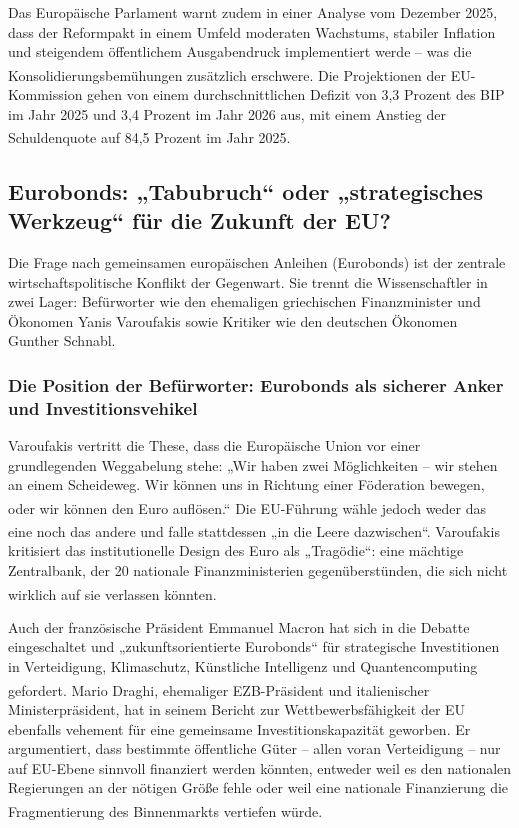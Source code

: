 \documentclass[12pt,a4paper]{article}
\newcommand{\footcite}[1]{\textsuperscript{\cite{#1}}}
\begin{document}
	Das Europäische Parlament warnt zudem in einer Analyse vom Dezember 2025, dass der Reformpakt in einem Umfeld moderaten Wachstums, stabiler Inflation und steigendem öffentlichem Ausgabendruck implementiert werde – was die Konsolidierungsbemühungen zusätzlich erschwere.\footcite{EPRS2025} Die Projektionen der EU-Kommission gehen von einem durchschnittlichen Defizit von 3,3 Prozent des BIP im Jahr 2025 und 3,4 Prozent im Jahr 2026 aus, mit einem Anstieg der Schuldenquote auf 84,5 Prozent im Jahr 2025.\footcite{EPRSDeficit2025}
	
	\subsection{Eurobonds: „Tabubruch“ oder „strategisches Werkzeug“ für die Zukunft der EU?}
	
	Die Frage nach gemeinsamen europäischen Anleihen (Eurobonds) ist der zentrale wirtschaftspolitische Konflikt der Gegenwart. Sie trennt die Wissenschaftler in zwei Lager: Befürworter wie den ehemaligen griechischen Finanzminister und Ökonomen Yanis Varoufakis sowie Kritiker wie den deutschen Ökonomen Gunther Schnabl.
	
	\subsubsection{Die Position der Befürworter: Eurobonds als sicherer Anker und Investitionsvehikel}
	
	Varoufakis vertritt die These, dass die Europäische Union vor einer grundlegenden Weggabelung stehe: „Wir haben zwei Möglichkeiten – wir stehen an einem Scheideweg. Wir können uns in Richtung einer Föderation bewegen, oder wir können den Euro auflösen.“\footcite{Varoufakis2026} Die EU-Führung wähle jedoch weder das eine noch das andere und falle stattdessen „in die Leere dazwischen“.\footcite{Varoufakis2026} Varoufakis kritisiert das institutionelle Design des Euro als „Tragödie“: eine mächtige Zentralbank, der 20 nationale Finanzministerien gegenüberstünden, die sich nicht wirklich auf sie verlassen könnten.\footcite{Varoufakis2026}
	
	Auch der französische Präsident Emmanuel Macron hat sich in die Debatte eingeschaltet und „zukunftsorientierte Eurobonds“ für strategische Investitionen in Verteidigung, Klimaschutz, Künstliche Intelligenz und Quantencomputing gefordert.\footcite{Euractiv2026} Mario Draghi, ehemaliger EZB-Präsident und italienischer Ministerpräsident, hat in seinem Bericht zur Wettbewerbsfähigkeit der EU ebenfalls vehement für eine gemeinsame Investitionskapazität geworben. Er argumentiert, dass bestimmte öffentliche Güter – allen voran Verteidigung – nur auf EU-Ebene sinnvoll finanziert werden könnten, entweder weil es den nationalen Regierungen an der nötigen Größe fehle oder weil eine nationale Finanzierung die Fragmentierung des Binnenmarkts vertiefen würde.\footcite{Euractiv2026}
	
\end{document}
